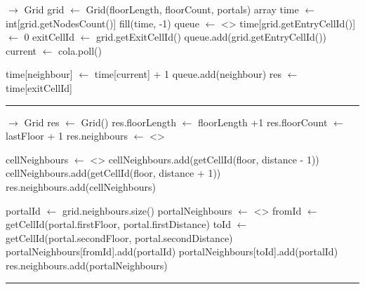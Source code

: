 
\begin{algorithm}[H]
\caption{}
\begin{algorithmic}[1]
{$\ensuremath{\rightarrow}$ }
\state Grid grid $\gets$ Grid(floorLength, floorCount, portals)
\state array time $\gets$ int[grid.getNodesCount()]
\state fill(time, -1)
\state queue $\gets$ <>
\state time[grid.getEntryCellId()] $\gets$ 0
\state exitCellId $\gets$ grid.getExitCellId()
\state queue.add(grid.getEntryCellId())
\state current $\gets$ cola.poll()

\state time[neighbour] $\gets$ time[current] + 1
\state queue.add(neighbour)
\endif
\EndFor
\endwhile
\state res $\gets$ time[exitCellId]
\EndFunction 
\end{algorithmic}
\hrule
{}
\end{algorithm}

\begin{algorithm}[H]
\caption{}
\begin{algorithmic}[1]
{$\ensuremath{\rightarrow}$ }
\state Grid res $\gets$ Grid()
\state res.floorLength $\gets$ floorLength +1
\state res.floorCount $\gets$ lastFloor + 1
\state res.neighbours $\gets$ <>

		\state cellNeighbours $\gets$ <>
			\state cellNeighbours.add(getCellId(floor, distance - 1))
		\endif
			\state cellNeighbours.add(getCellId(floor, distance + 1))
		\endif
		\state res.neighbours.add(cellNeighbours)	
	\EndFor
\EndFor

	\state portalId $\gets$ grid.neighbours.size()
	\state portalNeighbours $\gets$ <>
	\state fromId $\gets$ getCellId(portal.firstFloor, portal.firstDistance)
	\state toId $\gets$ getCellId(portal.secondFloor, portal.secondDistance)
	\state portalNeighbours[fromId].add(portalId)
	\state portalNeighbours[toId].add(portalId)
	\state res.neighbours.add(portalNeighbours)
\EndFor

\EndFunction 
\end{algorithmic}
\hrule
{}
\end{algorithm}